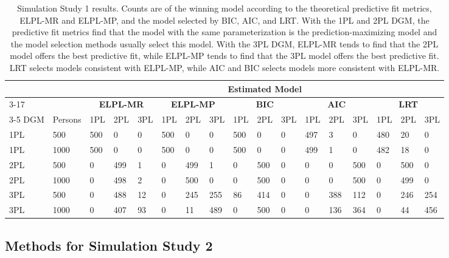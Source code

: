 \documentclass[
  english,
  man,floatsintext]{apa7}
\begin{document}
\setlength{\tabcolsep}{2pt}
\begin{table}
\caption{Simulation Study 1 results. Counts are of the winning model according to the theoretical predictive fit metrics, ELPL-MR and ELPL-MP, and the model selected by BIC, AIC, and LRT. With the 1PL and 2PL DGM, the predictive fit metrics find that the model with the same parameterization is the prediction-maximizing model and the model selection methods usually select this model. With the 3PL DGM, ELPL-MR tends to find that the 2PL model offers the best predictive fit, while ELPL-MP tends to find that the 3PL model offers the best predictive fit. LRT selects models consistent with ELPL-MP, while AIC and BIC selects models more consistent with ELPL-MR.}
\centering
\begin{small}
\begin{tabular}{@{\extracolsep{2pt}}lllllllllllllllll}
\hline
&&\multicolumn{15}{c}{\textbf{Estimated Model}} \\ \cmidrule{3-17}
\multirow{2}{*}{} &
    &
    \multicolumn{3}{c}{\textbf{ELPL-MR}} &
    \multicolumn{3}{c}{\textbf{ELPL-MP}} &
    \multicolumn{3}{c}{\textbf{BIC}} &
    \multicolumn{3}{c}{\textbf{AIC}} &
    \multicolumn{3}{c}{\textbf{LRT}} \\
    \cmidrule{3-5} \cmidrule{6-8} \cmidrule{9-11} \cmidrule{12-14} \cmidrule{15-17}
DGM & Persons & 1PL & 2PL & 3PL & 1PL & 2PL & 3PL & 1PL & 2PL & 3PL & 1PL & 2PL & 3PL & 1PL & 2PL & 3PL  \\
\hline
1PL & 500 & 500 & 0 & 0 & 500 & 0 & 0 & 500 & 0 & 0 & 497 & 3 & 0 & 480 & 20 & 0   \\
1PL & 1000 & 500 & 0 & 0 & 500 & 0 & 0 & 500 & 0 & 0 & 499 & 1 & 0 & 482 & 18 & 0 \\
2PL & 500 & 0 & 499 & 1 & 0 & 499 & 1 & 0 & 500 & 0 & 0 & 0 & 500 & 0 & 500 & 0\\
2PL & 1000 & 0 & 498 & 2 & 0 & 500 & 0 & 0 & 500 & 0 & 0 & 0 & 500 & 0 & 499 & 0 \\
3PL & 500 & 0 & 488 & 12 & 0 & 245 & 255 & 86 & 414 & 0 & 0 & 388 & 112 & 0 & 246 & 254\\
3PL & 1000 & 0 & 407 & 93 & 0 & 11 & 489 & 0 & 500 & 0 & 0 & 136 & 364 & 0 & 44 & 456\\
\hline
\end{tabular}
\end{small}
\label{tab:results1}
\end{table}

\hypertarget{methods-for-simulation-study-2}{%
\subsection{Methods for Simulation Study 2}\label{methods-for-simulation-study-2}}
\end{document}
